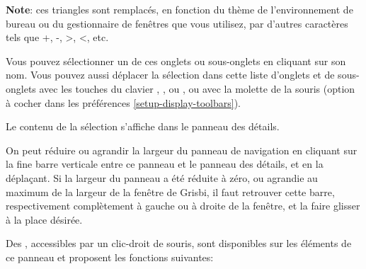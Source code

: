
\textbf{Note}: ces triangles sont remplacés, en fonction du thème de l'environnement de bureau ou du gestionnaire de fenêtres que vous utilisez, par d'autres caractères tels que +, -, >, <, etc.

Vous pouvez sélectionner un de ces onglets ou sous-onglets en cliquant sur son nom. Vous pouvez aussi déplacer la sélection dans cette liste d'onglets et de sous-onglets avec les touches du clavier , ,  ou , ou avec la molette de la souris (option à cocher dans les préférences \vref{setup-display-toolbars}). 


Le contenu de la sélection s'affiche dans le panneau des détails. 

On peut réduire ou agrandir la largeur du panneau de navigation en cliquant sur la fine barre verticale entre ce panneau et le panneau des détails, et en la déplaçant. Si la largeur du panneau a été réduite à zéro, ou agrandie au maximum de la largeur de la fenêtre de Grisbi, il faut retrouver cette barre, respectivement complètement à gauche ou à droite de la fenêtre, et la faire glisser à la place désirée. 

Des , accessibles par un clic-droit de souris, sont disponibles sur les éléments de ce panneau et proposent les fonctions suivantes:

